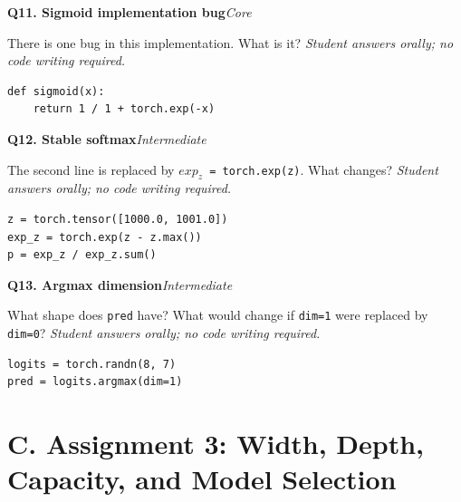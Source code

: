 \documentclass[11pt]{article}
\newif\ifshowanswers
\newenvironment{question}[3]{%
  \par\medskip
  \noindent\textbf{Q#1. #2}\hfill\textit{#3}\par\smallskip
}{\par\medskip}
\newcommand{\answer}[1]{%
  \ifshowanswers
    \begin{quote}\small\textbf{Expected answer:} #1\end{quote}
  \fi
}
\newcommand{\marking}[1]{%
  \ifshowanswers
    \begin{quote}\small\textbf{1 mark:} #1\end{quote}
  \fi
}
\newcommand{\oralnote}{\textit{Student answers orally; no code writing required.}}
\begin{document}
\begin{question}{11}{Sigmoid implementation bug}{Core}
There is one bug in this implementation. What is it? \oralnote

\begin{lstlisting}
def sigmoid(x):
    return 1 / 1 + torch.exp(-x)
\end{lstlisting}

\answer{The denominator needs parentheses: mathematically it should be $1/(1+e^{-x})$. As written, Python evaluates \texttt{1 / 1} first and then adds \texttt{exp(-x)}.}
\marking{Student identifies the missing parentheses/operator-precedence error.}
\end{question}

\begin{question}{12}{Stable softmax}{Intermediate}
The second line is replaced by \texttt{$exp_z$ = torch.exp(z)}. What changes? \oralnote

\begin{lstlisting}
z = torch.tensor([1000.0, 1001.0])
exp_z = torch.exp(z - z.max())
p = exp_z / exp_z.sum()
\end{lstlisting}

\answer{In exact mathematics the probabilities are unchanged by subtracting the same maximum from all logits, but removing the subtraction can cause overflow and non-finite values.}
\marking{Student explains numerical stability and that subtracting the maximum does not change the mathematical softmax probabilities.}
\end{question}

\begin{question}{13}{Argmax dimension}{Intermediate}
What shape does \texttt{pred} have? What would change if \texttt{dim=1} were replaced by \texttt{dim=0}? \oralnote

\begin{lstlisting}
logits = torch.randn(8, 7)
pred = logits.argmax(dim=1)
\end{lstlisting}

\answer{With \texttt{dim=1}, \texttt{pred} has shape $(8,)$: one predicted class per sample. With \texttt{dim=0}, the result has shape $(7,)$ and chooses one row/sample index for each class column, which is not the intended prediction operation.}
\marking{Student gives the correct shapes and understands which axis corresponds to classes.}
\end{question}

\section*{C. Assignment 3: Width, Depth, Capacity, and Model Selection}
\end{document}
